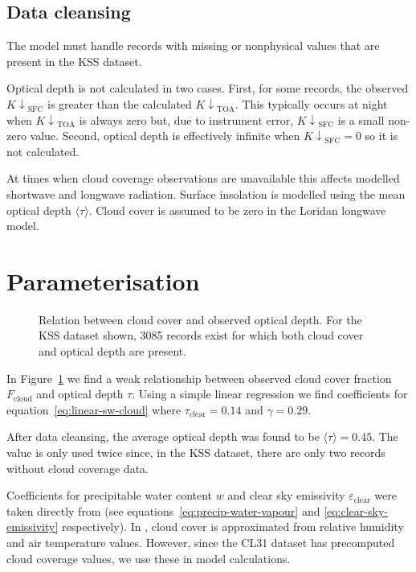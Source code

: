 \documentclass[a4paper,titlepage, twoside]{report}
\newcommand\Kdownsfc{{K\!\!\downarrow}_\mathrm{SFC}}
\newcommand\Kdowntoa{{K\!\!\downarrow}_\mathrm{TOA}}
\begin{document}
\subsection{Data cleansing}
The model must handle records with missing or nonphysical values that are present in the KSS dataset.  

Optical depth is not calculated in two cases.  First, for some records, the observed $\Kdownsfc$ is greater than the calculated $\Kdowntoa$.  This typically occurs at night when $\Kdowntoa$ is always zero but, due to instrument error, $\Kdownsfc$ is a small non-zero value.  Second, optical depth is effectively infinite when $\Kdownsfc = 0$ so it is not calculated.

At times when cloud coverage observations are unavailable this affects modelled shortwave and longwave radiation.  Surface insolation is modelled using the mean optical depth $\langle \tau \rangle$.  Cloud cover is assumed to be zero in the Loridan longwave model.

\section{Parameterisation}
\label{sec:parameterisation}

\begin{figure}
\centering

\caption{Relation between cloud cover and observed optical depth.  For the KSS dataset shown, 3085 records exist for which both cloud cover and optical depth are present.}
\label{fig:cloud-tau-fit}
\end{figure}

In Figure~\ref{fig:cloud-tau-fit} we find a weak relationship between observed cloud cover fraction $F_\mathrm{cloud}$ and optical depth $\tau$.  Using a simple linear regression we find coefficients for equation~\ref{eq:linear-sw-cloud} where $\tau_\mathrm{clear} = 0.14$ and $\gamma =  0.29$.

After data cleansing, the average optical depth was found to be $\langle \tau \rangle = 0.45$.  The value is only used twice since, in the KSS dataset, there are only two records without cloud coverage data.

Coefficients for precipitable water content $w$ and clear sky emissivity $\varepsilon_\mathrm{clear}$ were taken directly from \cite{loridan} (see equations~\ref{eq:precip-water-vapour} and \ref{eq:clear-sky-emissivity} respectively).  In \cite{loridan}, cloud cover is approximated from relative humidity and air temperature values.  However, since the CL31 dataset has precomputed cloud coverage values, we use these in model calculations.
\end{document}
